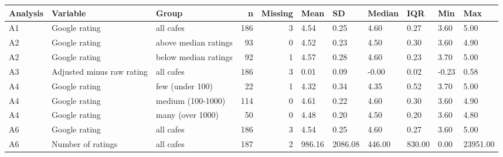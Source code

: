 \begin{table}[ht]
\centering
\begingroup\footnotesize
\begin{tabular}{lllrrllllll}
  \toprule
Analysis & Variable & Group & n & Missing & Mean & SD & Median & IQR & Min & Max \\ 
  \midrule
A1 & Google rating & all cafes & 186 &   3 & 4.54 & 0.25 & 4.60 & 0.27 & 3.60 & 5.00 \\ 
  A2 & Google rating & above median ratings &  93 &   0 & 4.52 & 0.23 & 4.50 & 0.30 & 3.60 & 4.90 \\ 
  A2 & Google rating & below median ratings &  92 &   1 & 4.57 & 0.28 & 4.60 & 0.23 & 3.70 & 5.00 \\ 
  A3 & Adjusted minus raw rating & all cafes & 186 &   3 & 0.01 & 0.09 & -0.00 & 0.02 & -0.23 & 0.58 \\ 
  A4 & Google rating & few (under 100) &  22 &   1 & 4.32 & 0.34 & 4.35 & 0.52 & 3.70 & 5.00 \\ 
  A4 & Google rating & medium (100-1000) & 114 &   0 & 4.61 & 0.22 & 4.60 & 0.30 & 3.60 & 4.90 \\ 
  A4 & Google rating & many (over 1000) &  50 &   0 & 4.48 & 0.20 & 4.50 & 0.20 & 3.60 & 4.80 \\ 
  A6 & Google rating & all cafes & 186 &   3 & 4.54 & 0.25 & 4.60 & 0.27 & 3.60 & 5.00 \\ 
  A6 & Number of ratings & all cafes & 187 &   2 & 986.16 & 2086.08 & 446.00 & 830.00 & 0.00 & 23951.00 \\ 
   \bottomrule
\end{tabular}
\endgroup
\end{table}
